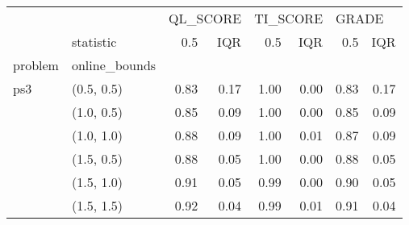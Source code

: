 \begin{tabular}{llrrrrrr}
\toprule
    & {} & \multicolumn{2}{l}{QL\_SCORE} & \multicolumn{2}{l}{TI\_SCORE} & \multicolumn{2}{l}{GRADE} \\
    & statistic &      0.5 &  IQR &      0.5 &  IQR &   0.5 &  IQR \\
problem & online\_bounds &          &      &          &      &       &      \\
\midrule
ps3 & (0.5, 0.5) &     0.83 & 0.17 &     1.00 & 0.00 &  0.83 & 0.17 \\
    & (1.0, 0.5) &     0.85 & 0.09 &     1.00 & 0.00 &  0.85 & 0.09 \\
    & (1.0, 1.0) &     0.88 & 0.09 &     1.00 & 0.01 &  0.87 & 0.09 \\
    & (1.5, 0.5) &     0.88 & 0.05 &     1.00 & 0.00 &  0.88 & 0.05 \\
    & (1.5, 1.0) &     0.91 & 0.05 &     0.99 & 0.00 &  0.90 & 0.05 \\
    & (1.5, 1.5) &     0.92 & 0.04 &     0.99 & 0.01 &  0.91 & 0.04 \\
\bottomrule
\end{tabular}
